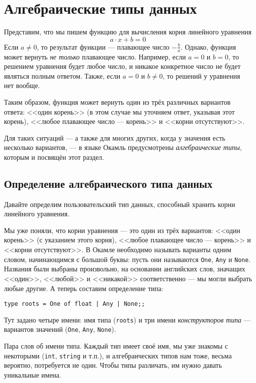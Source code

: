 \section{Алгебраические типы данных}

Представим, что мы пишем функцию для вычисления корня линейного
уравнения $$a \cdot x + b = 0$$ 
Если $a \ne 0$, то результат функции --- плавающее число $-\frac{b}{a}$.
Однако, функция может вернуть \emph{не только} плавающее число. 
Например, если $a = 0$ и $b = 0$, то решением уравнения будет любое число,
и никакое конкретное число не будет являться полным ответом.
Также, если $a = 0$ и $b \ne 0$, то решений у уравнения нет вообще.

Таким образом, функция может вернуть один из трёх различных вариантов
ответа: <<один корень>> (в этом случае мы уточняем ответ, указывая
этот корень), <<любое плавающее число --- корень>> и <<корни отсутствуют>>. 

Для таких ситуаций --- а также для многих других, когда у значения есть
несколько вариантов, --- в языке Окамль предусмотрены 
\emph{алгебраические типы}, которым и посвящён этот раздел.

\subsection{Определение алгебраического типа данных}

Давайте определим пользовательский тип данных, способный хранить 
корни линейного уравнения.

Мы уже поняли, что корни уравнения --- это один из трёх вариантов:
<<один корень>> (с указанием этого корня), <<любое плавающее число --- корень>> и <<корни отсутствуют>>. 
В Окамле необходимо называть варианты одним словом, начинающимся с большой буквы: 
пусть они называются \verb!One!, \verb!Any! и \verb!None!. Названия были выбраны
произвольно, на основании английских слов, значащих <<один>>, <<любой>> и
<<никакой>> соответственно --- мы могли выбрать любые другие. 
А теперь составим определение типа:

\begin{verbatim}
type roots = One of float | Any | None;;
\end{verbatim}

Тут задано четыре имени: имя типа (\verb!roots!) и три имени \emph{конструкторов типа} ---
вариантов значений (\verb!One!, \verb!Any!, \verb!None!). 

Пара слов об имени типа. Каждый тип имеет своё имя, мы уже знакомы с некоторыми 
(\verb!int!, \verb!string! и т.п.), и алгебраических типов нам тоже, весьма вероятно,
потребуется не один. Чтобы типы различать, им нужно давать уникальные имена.

